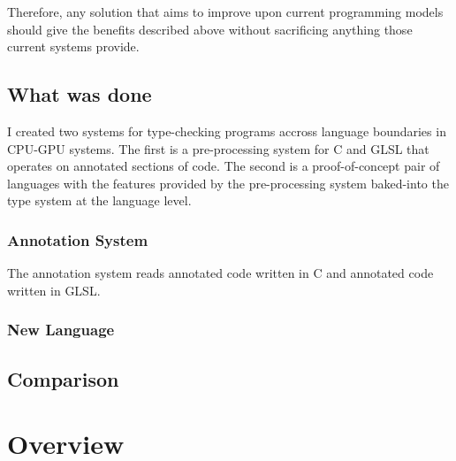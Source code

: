 \documentclass[a4paper,12pt,twoside,openright]{report}
\begin{document}
Therefore, any solution that aims to improve upon current programming models
should give the benefits described above without sacrificing anything those
current systems provide.

\subsection{What was done}

I created two systems for type-checking programs accross language boundaries in
CPU-GPU systems. The first is a pre-processing system for C and GLSL that
operates on annotated sections of code. The second is a proof-of-concept pair
of languages with the features provided by the pre-processing system baked-into
the type system at the language level.

\subsubsection{Annotation System}

The annotation system reads annotated code written in C and annotated code
written in GLSL.


\subsubsection{New Language}

\subsection{Comparison}


\section{Overview}



\end{document}
